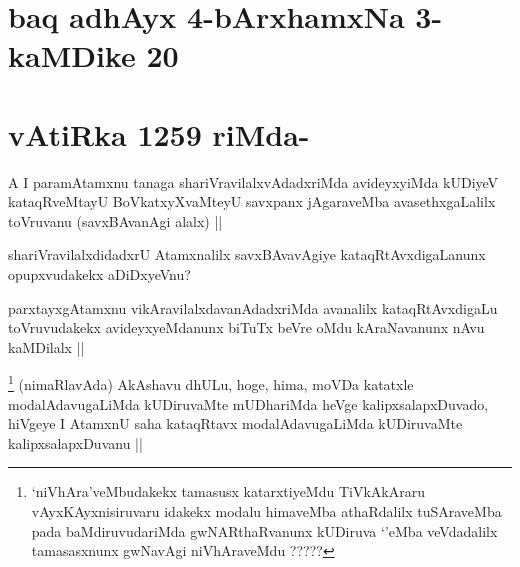 \section*{baq adhAyx 4-bArxhamxNa 3- kaMDike 20}

\section*{vAtiRka 1259 riMda-}


\begin{artha}
A I paramAtamxnu tanaga shariVravilalxvAdadxriMda avideyxyiMda kUDiyeV kataqRveMtayU BoVkatxyXvaMteyU savxpanx jAgaraveMba avasethxgaLalilx toVruvanu (savxBAvanAgi alalx) ||
\end{artha}

\begin{artha}
shariVravilalxdidadxrU Atamxnalilx savxBAvavAgiye kataqRtAvxdigaLanunx opupxvudakekx aDiDxyeVnu?
\end{artha}

\begin{artha}
parxtayxgAtamxnu vikAravilalxdavanAdadxriMda avanalilx kataqRtAvxdigaLu toVruvudakekx avideyxyeMdanunx biTuTx beVre oMdu kAraNavanunx nAvu kaMDilalx ||
\end{artha}


\begin{artha}
\footnote{`niVhAra'veMbudakekx tamasusx katarxtiyeMdu TiVkAkAraru vAyxKAyxnisiruvaru idakekx modalu himaveMba athaRdalilx tuSAraveMba pada baMdiruvudariMda gwNARthaRvanunx kUDiruva `\stext'eMba veVdadalilx tamasasxnunx gwNavAgi niVhAraveMdu ?????}
(nimaRlavAda) AkAshavu dhULu, hoge, hima, moVDa katatxle modalAdavugaLiMda kUDiruvaMte mUDhariMda heVge kalipxsalapxDuvado, hiVgeye I AtamxnU saha kataqRtavx modalAdavugaLiMda kUDiruvaMte kalipxsalapxDuvanu ||
\end{artha}

